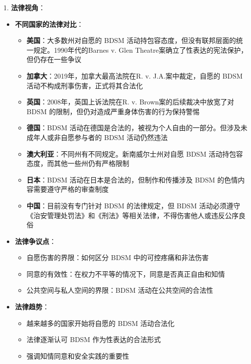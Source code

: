\documentclass[12pt,UTF8]{ctexbook}
\begin{document}
1. \textbf{法律视角}：
  \begin{itemize}
  \item \textbf{不同国家的法律对比}：
    \begin{itemize}
    \item \textbf{美国}：大多数州对自愿的 BDSM 活动持包容态度，但没有联邦层面的统一规定。1990年代的Barnes v. Glen Theatre案确立了性表达的宪法保护，但仍存在一些争议
    \item \textbf{加拿大}：2019年，加拿大最高法院在R. v. J.A.案中裁定，自愿的 BDSM 活动不构成刑事伤害，正式将其合法化
    \item \textbf{英国}：2008年，英国上诉法院在R. v. Brown案的后续裁决中放宽了对 BDSM 的限制，但仍对造成严重身体伤害的行为保持警惕
    \item \textbf{德国}：BDSM 活动在德国是合法的，被视为个人自由的一部分。但涉及未成年人或非自愿参与者的 BDSM 活动仍然违法
    \item \textbf{澳大利亚}：不同州有不同规定。新南威尔士州对自愿 BDSM 活动持包容态度，而其他一些州仍有严格限制
    \item \textbf{日本}：BDSM 活动在日本是合法的，但制作和传播涉及 BDSM 的色情内容需要遵守严格的审查制度
    \item \textbf{中国}：目前没有专门针对 BDSM 的法律规定，但 BDSM 活动必须遵守《治安管理处罚法》和《刑法》等相关法律，不得伤害他人或违反公序良俗
    \end{itemize}
  \item \textbf{法律争议点}：
    \begin{itemize}
    \item 自愿伤害的界限：如何区分 BDSM 中的可控疼痛和非法伤害
    \item 同意的有效性：在权力不平等的情况下，同意是否真正自由和知情
    \item 公共空间与私人空间的界限：BDSM 活动在公共空间的合法性
    \end{itemize}
  \item \textbf{法律趋势}：
    \begin{itemize}
    \item 越来越多的国家开始将自愿的 BDSM 活动合法化
    \item 法律逐渐认可 BDSM 作为性表达的合法形式
    \item 强调知情同意和安全实践的重要性
    \end{itemize}
  \end{itemize}
\end{document}
